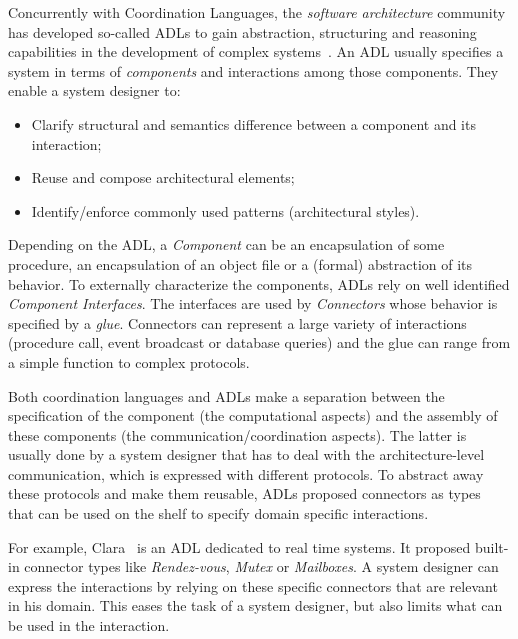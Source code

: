 Concurrently with Coordination Languages, the \emph{software architecture} community has developed so-called ADLs to gain abstraction, structuring and reasoning capabilities in the development of complex systems~\cite{rapidebib,wrightbib,uniconbib,frameadlsbib,garlansoftarchbib}. An ADL usually specifies a system in terms of \emph{components} and interactions among those components. They enable a system designer to:
\begin{itemize}
	\item Clarify structural and semantics difference between a component and its interaction;
	\item Reuse and compose architectural elements;
	\item Identify/enforce commonly used patterns (\eg architectural styles).
\end{itemize}

Depending on the ADL, a \emph{Component} can be an encapsulation of some procedure, an encapsulation of an object file or a (formal) abstraction of its behavior. To externally characterize the components, ADLs rely on well identified \emph{Component Interfaces}. The interfaces are used by \emph{Connectors} whose behavior is specified by a \emph{glue}. Connectors can represent a large variety of interactions (\eg procedure call, event broadcast or database queries) and the glue can range from a simple function to complex protocols. 

Both coordination languages and ADLs make a separation between the specification of the component (\ie the computational aspects) and the assembly of these components (\ie the communication/coordination aspects). The latter is usually done by a system designer that has to deal with the architecture-level communication, which is expressed with different protocols. To abstract away these protocols and make them reusable, ADLs proposed connectors as types~\cite{frameadlsbib} that can be used on the shelf to specify domain specific interactions.

For example, Clara~\cite{clarabib} is an ADL dedicated to real time systems. It proposed built-in connector types like \emph{Rendez-vous}, \emph{Mutex} or \emph{Mailboxes}. A system designer can express the interactions by relying on these specific connectors that are relevant in his domain. This eases the task of a system designer, but also limits what can be used in the interaction. 

